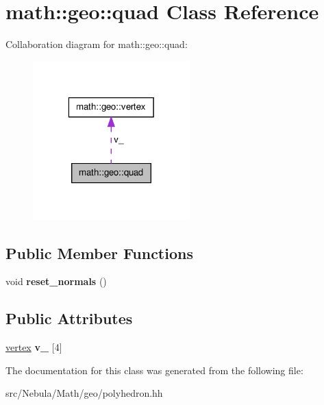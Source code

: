 \hypertarget{classmath_1_1geo_1_1quad}{\section{math\-:\-:geo\-:\-:quad \-Class \-Reference}
\label{classmath_1_1geo_1_1quad}
}


\-Collaboration diagram for math\-:\-:geo\-:\-:quad\-:\nopagebreak
\begin{figure}[H]
\begin{center}
\leavevmode
\includegraphics[width=172pt]{classmath_1_1geo_1_1quad__coll__graph}
\end{center}
\end{figure}
\subsection*{\-Public \-Member \-Functions}
\begin{DoxyCompactItemize}
\item 
\hypertarget{classmath_1_1geo_1_1quad_a61f7422d3d82b7acab0aabd71b68fccf}{void {\bfseries reset\-\_\-normals} ()}\label{classmath_1_1geo_1_1quad_a61f7422d3d82b7acab0aabd71b68fccf}

\end{DoxyCompactItemize}
\subsection*{\-Public \-Attributes}
\begin{DoxyCompactItemize}
\item 
\hypertarget{classmath_1_1geo_1_1quad_a6625bbd8467b8a853aae1f4f2a2362ec}{\hyperlink{classmath_1_1geo_1_1vertex}{vertex} {\bfseries v\-\_\-} \mbox{[}4\mbox{]}}\label{classmath_1_1geo_1_1quad_a6625bbd8467b8a853aae1f4f2a2362ec}

\end{DoxyCompactItemize}


\-The documentation for this class was generated from the following file\-:\begin{DoxyCompactItemize}
\item 
src/\-Nebula/\-Math/geo/polyhedron.\-hh\end{DoxyCompactItemize}
